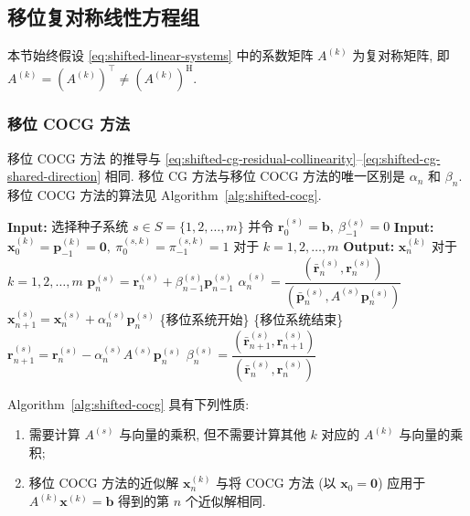 \subsection{{移位复对称线性方程组}}\label{sec:shifted-complex-symmetric-systems}\label{srcpage:printed-171}
{本节始终假设 \eqref{eq:shifted-linear-systems} 中的系数矩阵 $A^{(k)}$ 为复对称矩阵, 即 $A^{(k)}=(A^{(k)})^{\top}\ne(A^{(k)})^{\mathrm H}$.}
\subsubsection{{移位 COCG 方法}}\label{subsec:shifted-cocg}
{移位 COCG 方法  的推导与 \eqref{eq:shifted-cg-residual-collinearity}--\eqref{eq:shifted-cg-shared-direction} 相同. 移位 CG 方法与移位 COCG 方法的唯一区别是 $\alpha_n$ 和 $\beta_n$. 移位 COCG 方法的算法见 Algorithm\ \ref{alg:shifted-cocg}.}
\begin{algorithm}[H]\caption{{移位 COCG 方法 (注意: $(\bar{\bm a},\bm b)=\bm a^{\top}\bm b$)}}\label{alg:shifted-cocg}\begin{algorithmic}[1]
\Statex\textbf{Input:} {选择种子系统 $s\in S=\{1,2,\ldots,m\}$ 并令 $\bm r_0^{(s)}=\bm b,\ \beta_{-1}^{(s)}=0$}
\Statex\textbf{Input:} $\bm x_0^{(k)}=\bm p_{-1}^{(k)}=\bm0,\ \pi_0^{(s,k)}=\pi_{-1}^{(s,k)}=1$ {对于} $k=1,2,\ldots,m$
\Statex\textbf{Output:} $\bm x_n^{(k)}$ {对于} $k=1,2,\ldots,m$
\State $\bm p_n^{(s)}=\bm r_n^{(s)}+\beta_{n-1}^{(s)}\bm p_{n-1}^{(s)}$
\State $\alpha_n^{(s)}=\dfrac{(\bar{\bm r}_n^{(s)},\bm r_n^{(s)})}{(\bar{\bm p}_n^{(s)},A^{(s)}\bm p_n^{(s)})}$
\State $\bm x_{n+1}^{(s)}=\bm x_n^{(s)}+\alpha_n^{(s)}\bm p_n^{(s)}$
\State \{{移位系统开始}\}
\State \{{移位系统结束}\}
\State $\bm r_{n+1}^{(s)}=\bm r_n^{(s)}-\alpha_n^{(s)}A^{(s)}\bm p_n^{(s)}$
\State $\beta_n^{(s)}=\dfrac{(\bar{\bm r}_{n+1}^{(s)},\bm r_{n+1}^{(s)})}{(\bar{\bm r}_n^{(s)},\bm r_n^{(s)})}$
\EndFor\end{algorithmic}\end{algorithm}
{Algorithm\ \ref{alg:shifted-cocg} 具有下列性质:}
\begin{enumerate}
\item {需要计算 $A^{(s)}$ 与向量的乘积, 但不需要计算其他 $k$ 对应的 $A^{(k)}$ 与向量的乘积;}
\item {移位 COCG 方法的近似解 $\bm x_n^{(k)}$ 与将 COCG 方法 (以 $\bm x_0=\bm0$) 应用于 $A^{(k)}\bm x^{(k)}=\bm b$ 得到的第 $n$ 个近似解相同.}
\end{enumerate}
